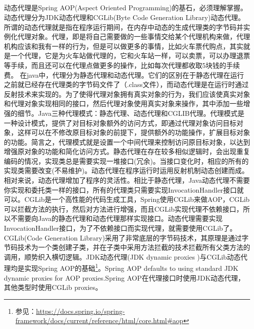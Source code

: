 \documentclass[../../../interview-questions.tex]{subfiles}
\begin{document}
\subsection{\color{red}{Java的静态代理(Static Proxy)和动态代理(Dynamic Proxy)有什么差别？}}

动态代理是Spring AOP(Aspect Oriented Programming)的基石，必须理解掌握。动态代理分为JDK动态代理和CGLib(Byte Code Generation Library)动态代理。所谓的动态代理就是指在程序运行期间，在内存中动态的生成代理类的字节码并实例化代理对象。代理，即是将自己需要做的一些事情交给某个代理机构来做，代理机构应该和我有一样的行为，但是可以做更多的事情，比如火车票代购点，其实就是一个代理，它是为火车站做代理的，它和火车站一样，可以卖票，可以办理退票等手续，而且还可以在代理点做更多的操作，比如每次代理都收取5块钱的手续费。
在java中，代理分为静态代理和动态代理。它们的区别在于静态代理在运行之前就已经存在代理类的字节码文件了（.class文件），而动态代理是在运行时通过反射技术来实现的。为了使得代理对象拥有真实对象的行为，我们应该使真实对象和代理对象实现相同的接口，然后代理对象使用真实对象来操作，其中添加一些增强的细节。Java三种代理模式：静态代理、动态代理和CGLIB代理。代理模式是一种设计模式，提供了对目标对象额外的访问方式，即通过代理对象访问目标对象，这样可以在不修改原目标对象的前提下，提供额外的功能操作，扩展目标对象的功能。简言之，代理模式就是设置一个中间代理来控制访问原目标对象，以达到增强原对象的功能和简化访问方式。静态代理在存在较多相似逻辑时，会出现重复编码的情况，实现类总是需要实现一堆接口(冗余)。当接口变化时，相应的所有的实现类需要改变(不易维护)。动态代理在程序运行时运用反射机制动态创建而成。相对来说，动态代理增加了程序的灵活性。相比于静态代理，Java动态代理不需要你实现和委托类一样的接口，所有的代理类只需要实现InvocationHandler接口就可以。CGLib是一个高性能的代码生成工具，Spring使用CGLib来做AOP，CGLib可以拦截方法的执行，然后对方法进行增强，而且CGLib实现代理不依赖接口，所以不需要向Java的静态代理和动态代理那样实现接口。动态代理需要实现InvocationHandler接口，为了不依赖接口而实现代理，就需要使用CGLib了。CGLib(Code Generation Library)采用了非常底层的字节码技术，其原理是通过字节码技术为一个类创建子类，并在子类中采用方法拦截的技术拦截所有父类方法的调用，顺势织入横切逻辑。JDK动态代理(JDK dynamic proxies )与CGLib动态代理均是实现Spring AOP的基础\footnote{参见：\url{https://docs.spring.io/spring-framework/docs/current/reference/html/core.html\#aop}}。Spring AOP defaults to using standard JDK dynamic proxies for AOP proxies.Spring AOP在代理接口时使用JDK动态代理，其他类型时使用CGLib proxies。
\end{document}
